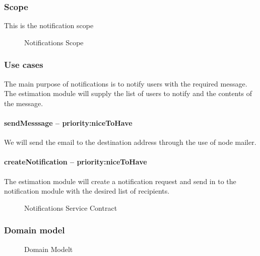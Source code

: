 \subsubsection{Scope}
This is the notification scope
	\begin{figure}[H]
	    	\centering
	    	\caption{Notifications Scope}
	    	\label{fig:Notification_Scope}
   	\end{figure}
\subsubsection{Use cases}
The main purpose of notifications is to notify users with the required message. The estimation module will supply the list of users to notify and the contents of the message.
\paragraph{sendMesssage -- priority:niceToHave}
We will send the email to the destination address through the use of node mailer. 
\paragraph{createNotification -- priority:niceToHave}
The estimation module will create a notification request and send in to the notification module with the desired list of recipients.
	\begin{figure}[H]
	    	\centering
	    	\caption{Notifications Service Contract}
	    	\label{fig:Notification_Service Contract}
   	\end{figure}
\subsubsection{Domain model}
	\begin{figure}[H]
	    	\centering
	    	\caption{Domain Modelt}
	    	\label{fig:Domain Model}
   	\end{figure}
